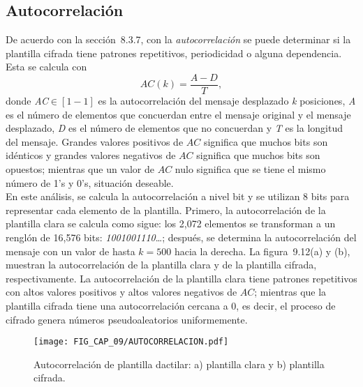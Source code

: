 \subsection{Autocorrelación}
De acuerdo con la sección~8.3.7, con la \textit{autocorrelación} se puede determinar si la plantilla cifrada tiene patrones repetitivos, periodicidad o alguna dependencia. Esta se calcula con
\begin{equation}
AC(k) = \frac {A-D}{T},
\end{equation}
donde \textit{AC}$\in [1 -1]$ es la autocorrelación del mensaje desplazado \textit{k} posiciones, \textit{A} es el número de elementos que concuerdan entre el mensaje original y el mensaje desplazado, \textit{D} es el número de elementos que no concuerdan y \textit{T} es la longitud del mensaje. Grandes valores positivos de $AC$ significa que muchos bits son idénticos y grandes valores negativos de $AC$ significa que muchos bits son opuestos; mientras que un valor de $AC$ nulo significa que se tiene el mismo número de 1's y 0's, situación deseable.   \\

En este análisis, se calcula la autocorrelación a nivel bit y se utilizan 8 bits para representar cada elemento de la plantilla. Primero, la autocorrelación de la plantilla clara se calcula como sigue: los 2,072 elementos se transforman a un renglón de 16,576 bits: \textit{1001001110}\ldots; después, se determina la autocorrelación del mensaje con un valor de hasta $k=500$ hacia la derecha. La figura~9.12(a) y (b), muestran la autocorrelación de la plantilla clara y de la plantilla cifrada, respectivamente. La autocorrelación de la plantilla clara tiene patrones repetitivos con altos valores positivos y altos valores negativos de $AC$; mientras que la plantilla cifrada tiene una autocorrelación cercana a 0, es decir, el proceso de cifrado genera números pseudoaleatorios uniformemente. \\

\begin{figure}[!htbp] %
	\center
	\texttt{[image: FIG\_CAP\_09/AUTOCORRELACION.pdf]}    
	\caption{Autocorrelación de plantilla dactilar: a) plantilla clara y b) plantilla cifrada.}
\end{figure}

